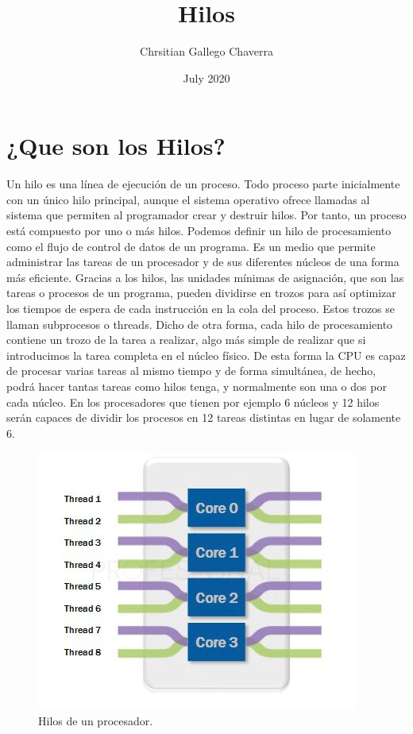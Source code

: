 \documentclass{article}
\title{Hilos}
\author{Chrsitian Gallego Chaverra}
\date{July 2020}
\begin{document}
\maketitle

\section{¿Que son los Hilos?}
Un hilo es una línea de ejecución de un proceso. Todo proceso parte inicialmente con un único hilo principal, aunque el sistema operativo ofrece llamadas al sistema que permiten al programador crear y destruir hilos. Por tanto, un proceso está compuesto por uno o más hilos.
Podemos definir un hilo de procesamiento como el flujo de control de datos de un programa. Es un medio que permite administrar las tareas de un procesador y de sus diferentes núcleos de una forma más eficiente. Gracias a los hilos, las unidades mínimas de asignación, que son las tareas o procesos de un programa, pueden dividirse en trozos para así optimizar los tiempos de espera de cada instrucción en la cola del proceso. Estos trozos se llaman subprocesos o threads.
Dicho de otra forma, cada hilo de procesamiento contiene un trozo de la tarea a realizar, algo más simple de realizar que si introducimos la tarea completa en el núcleo físico. De esta forma la CPU es capaz de procesar varias tareas al mismo tiempo y de forma simultánea, de hecho, podrá hacer tantas tareas como hilos tenga, y normalmente son una o dos por cada núcleo. En los procesadores que tienen por ejemplo 6 núcleos y 12 hilos serán capaces de dividir los procesos en 12 tareas distintas en lugar de solamente 6\cite{intro}.

\begin{figure}[h!]
\centering
\includegraphics[scale=0.9]{hilos.JPG}
\caption{Hilos de un procesador.\cite{intro}}
\label{fig:hilos}
\end{figure}
\end{document}
